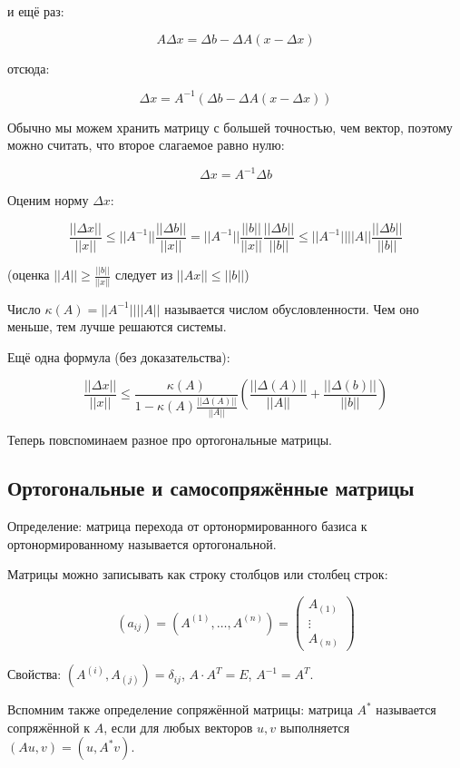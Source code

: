 \documentclass[12pt]{article}
\begin{document}
и ещё раз:

\[
A \Delta x = \Delta b - \Delta A (x - \Delta x)
\]

отсюда:

\[
\Delta x = A^{-1} (\Delta b - \Delta A (x - \Delta x))
\]

Обычно мы можем хранить матрицу с большей точностью, чем вектор, поэтому можно считать, что второе слагаемое равно нулю:

\[
\Delta x = A^{-1} \Delta b
\]

Оценим норму $\Delta x$:

\[
\frac {||\Delta x||} {||x||} \leq
||A^{-1}|| \frac {||\Delta b||} {||x||} =
||A^{-1}|| \frac {||b||} {||x||} \frac {||\Delta b||} {||b||} \leq
||A^{-1}|| ||A|| \frac {||\Delta b||} {||b||}
\]

(оценка $||A|| \geq \frac {||b||} {||x||}$ следует из $||Ax|| \leq ||b||$)

Число $\kappa(A) = ||A^{-1}|| ||A||$ называется числом обусловленности. Чем оно меньше, тем лучше решаются системы.

Ещё одна формула (без доказательства):

\[
\frac {||\Delta x||} {||x||} \leq
\frac {\kappa(A)} {1 - \kappa(A) \frac {||\Delta(A)||} {||A||}} \left( \frac {||\Delta(A)||} {||A||} + \frac {||\Delta(b)||} {||b||} \right)
\]

Теперь повспоминаем разное про ортогональные матрицы.

\subsection{Ортогональные и самосопряжённые матрицы}

Определение: матрица перехода от ортонормированного базиса к ортонормированному называется ортогональной.

Матрицы можно записывать как строку столбцов или столбец строк:

\[
(a_{ij}) = (A^{(1)}, \ldots, A^{(n)}) = \left(
\begin{matrix}
A_{(1)} \\
\vdots \\
A_{(n)}
\end{matrix}\right)
\]

Свойства: $(A^{(i)}, A_{(j)}) = \delta_{ij}$, $A \cdot A^T = E$, $A^{-1} = A^T$.

Вспомним также определение сопряжённой матрицы: матрица $A^*$ называется сопряжённой к $A$, если для любых векторов $u, v$ выполняется $(Au, v) = (u, A^* v)$.
\end{document}
